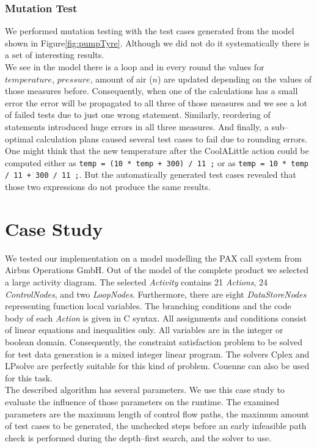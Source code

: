 \documentclass[runningheads,a4paper]{llncs}%
\newcommand{\UMLType}[1]{\textsf{\textit{#1}}} %
\begin{document}
\subsubsection{Mutation Test}
We performed mutation testing with the test cases generated from the model shown in Figure\ref{fig:pumpTyre}. Although we did not do it systematically there is a set of interesting results.\\
We see in the model there is a loop and in every round the values for $temperature$, $pressure$, amount of air ($n$) are updated depending on the values of those measures before. Consequently, when one of the calculations has a small error the error will be propagated to all three of those measures and we see a lot of failed tests due to just one wrong statement. Similarly, reordering of statements introduced huge errors in all three measures. And finally, a sub--optimal calculation plans caused several test cases to fail due to rounding errors. One might think that the new temperature after the \textsf{CoolALittle} action could be computed either as \verb$temp = (10 * temp + 300) / 11 ;$ or as \verb$temp = 10 * temp / 11 + 300 / 11 ;$. But the automatically generated test cases revealed that those two expressions do not produce the same results.
\section{Case Study}%
\label{sec:CaseStudy}
We tested our implementation on a model modelling the PAX call system from Airbus Operations GmbH. Out of the model of the complete product we selected a large activity diagram. The selected \UMLType{Activity} contains 21 \UMLType{Actions}, 24 \UMLType{ControlNodes}, and two \UMLType{LoopNodes}. Furthermore, there are eight \UMLType{DataStoreNodes} representing function local variables. The branching conditions and the code body of each \UMLType{Action} is given in C syntax. All assignments and conditions consist of linear equations and inequalities only. All variables are in the integer or boolean domain. Consequently, the constraint satisfaction problem to be solved for test data generation is a mixed integer linear program. The solvers Cplex and LPsolve are perfectly suitable for this kind of problem. Couenne can also be used for this task.\\
The described algorithm has several parameters. We use this case study to evaluate the influence of those parameters on the runtime. The examined parameters are the maximum length of control flow paths, the maximum amount of test cases to be generated, the unchecked steps before an early infeasible path check is performed during the depth--first search, and the solver to use.
\end{document}

